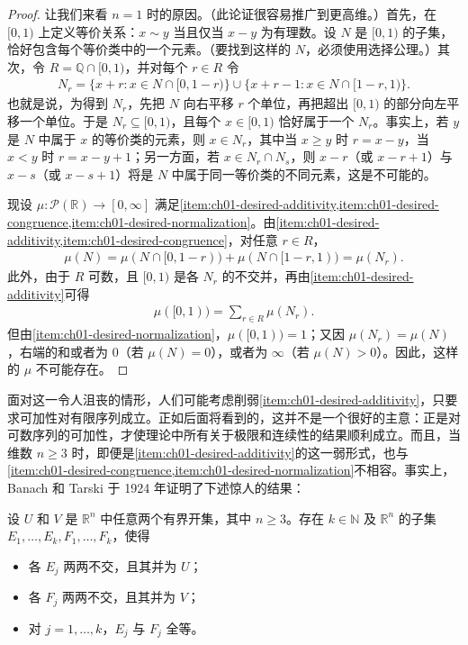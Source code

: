 \documentclass[../../main.tex]{subfiles}%
\begin{document}
\begin{proof}
让我们来看 $n=1$ 时的原因。（此论证很容易推广到更高维。）首先，在 $[0,1)$ 上定义等价关系：$x\sim y$ 当且仅当 $x-y$ 为有理数。设 $N$ 是 $[0,1)$ 的子集，恰好包含每个等价类中的一个元素。（要找到这样的 $N$，必须使用选择公理。）其次，令 $R=\mathbb{Q}\cap[0,1)$，并对每个 $r\in R$ 令
\begin{align*}
N_r=\{x+r:x\in N\cap[0,1-r)\}\cup\{x+r-1:x\in N\cap[1-r,1)\}.
\end{align*}
也就是说，为得到 $N_r$，先把 $N$ 向右平移 $r$ 个单位，再把超出 $[0,1)$ 的部分向左平移一个单位。于是 $N_r\subseteq[0,1)$，且每个 $x\in[0,1)$ 恰好属于一个 $N_r$。事实上，若 $y$ 是 $N$ 中属于 $x$ 的等价类的元素，则 $x\in N_r$，其中当 $x\geqslant y$ 时 $r=x-y$，当 $x<y$ 时 $r=x-y+1$；另一方面，若 $x\in N_r\cap N_s$，则 $x-r$（或 $x-r+1$）与 $x-s$（或 $x-s+1$）将是 $N$ 中属于同一等价类的不同元素，这是不可能的。

现设 $\mu:\mathscr{P}(\mathbb{R})\to[0,\infty]$ 满足\cref{item:ch01-desired-additivity,item:ch01-desired-congruence,item:ch01-desired-normalization}。由\cref{item:ch01-desired-additivity,item:ch01-desired-congruence}，对任意 $r\in R$，
\begin{align*}
\mu(N)=\mu(N\cap[0,1-r))+\mu(N\cap[1-r,1))=\mu(N_r).
\end{align*}
此外，由于 $R$ 可数，且 $[0,1)$ 是各 $N_r$ 的不交并，再由\cref{item:ch01-desired-additivity}可得
\begin{align*}
\mu([0,1))=\sum_{r\in R}\mu(N_r).
\end{align*}
但由\cref{item:ch01-desired-normalization}，$\mu([0,1))=1$；又因 $\mu(N_r)=\mu(N)$，右端的和或者为 $0$（若 $\mu(N)=0$），或者为 $\infty$（若 $\mu(N)>0$）。因此，这样的 $\mu$ 不可能存在。
\end{proof}


面对这一令人沮丧的情形，人们可能考虑削弱\cref{item:ch01-desired-additivity}，只要求可加性对有限序列成立。正如后面将看到的，这并不是一个很好的主意：正是对可数序列的可加性，才使理论中所有关于极限和连续性的结果顺利成立。而且，当维数 $n\geqslant3$ 时，即便是\cref{item:ch01-desired-additivity}的这一弱形式，也与\cref{item:ch01-desired-congruence,item:ch01-desired-normalization}不相容。事实上，Banach 和 Tarski 于 1924 年证明了下述惊人的结果：

\begin{theorem}\label{theorem:ch01-banach-tarski-statement}
设 $U$ 和 $V$ 是 $\mathbb{R}^n$ 中任意两个有界开集，其中 $n\geqslant3$。存在 $k\in\mathbb{N}$ 及 $\mathbb{R}^n$ 的子集 $E_1,\ldots,E_k,F_1,\ldots,F_k$，使得
\begin{itemize}
\item 各 $E_j$ 两两不交，且其并为 $U$；
\item 各 $F_j$ 两两不交，且其并为 $V$；
\item 对 $j=1,\ldots,k$，$E_j$ 与 $F_j$ 全等。
\end{itemize}
\end{theorem}
\end{document}
